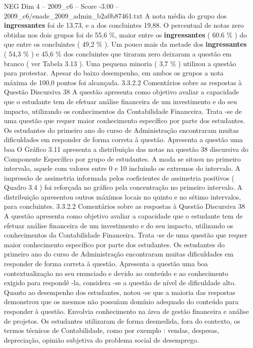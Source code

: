 \begin{textsample}{NEG Dim 4 – 2009\_c6 – Score -3.00 – 2009\_c6/enade\_2009\_admin\_b2a0b87461.txt}
A nota média do grupo dos \textbf{ingressantes} foi de 13,73, e a dos concluintes 19,88.
O percentual de notas zero obtidas nos dois grupos foi de 55,6 \%, maior entre os \textbf{ingressantes} ( 60.6 \% ) do que entre os concluintes ( 49,2 \% ).
Um pouco mais da metade dos \textbf{ingressantes} ( 54,3 \% ) e 45,6 \% dos concluintes que tiraram zero deixaram a questão em branco ( ver Tabela 3.13 ).
Uma pequena minoria ( 3,7 \% ) utilizou a questão para protestar.
Apesar do baixo desempenho, em ambos os grupos a nota máxima de 100,0 pontos foi alcançada. 3.3.2.2 Comentários sobre as respostas à Questão Discursiva 38 A questão apresenta como objetivo avaliar a capacidade que o estudante tem de efetuar análise financeira de um investimento e do seu impacto, utilizando os conhecimentos da Contabilidade Financeira.
Trata -se de uma questão que requer maior conhecimento específico por parte dos estudantes.
Os estudantes do primeiro ano do curso de Administração encontraram muitas dificuldades em responder de forma correta à questão.
Apresenta a questão uma boa O Gráfico 3.11 apresenta a distribuição das notas na questão 38 discursiva do Componente Específico por grupo de estudantes.
A moda se situou no primeiro intervalo, aquele com valores entre 0 e 10 incluindo os extremos do intervalo.
A impressão de assimetria informada pelos coeficientes de assimetria positivos ( Quadro 3.4 ) foi reforçada no gráfico pela concentração no primeiro intervalo.
A distribuição apresentou outros máximos locais no quinto e no sétimo intervalos, para concluintes. 3.3.2.2 Comentários sobre as respostas à Questão Discursiva 38 A questão apresenta como objetivo avaliar a capacidade que o estudante tem de efetuar análise financeira de um investimento e do seu impacto, utilizando os conhecimentos da Contabilidade Financeira.
Trata -se de uma questão que requer maior conhecimento específico por parte dos estudantes.
Os estudantes do primeiro ano do curso de Administração encontraram muitas dificuldades em responder de forma correta à questão.
Apresenta a questão uma boa contextualização no seu enunciado e devido ao conteúdo e ao conhecimento exigido para respondê -la, considera -se a questão de nível de dificuldade alto.
Quanto ao desempenho dos estudantes, notou -se que a maioria das respostas demonstrou que os mesmos não possuíam domínio adequado do conteúdo para responder à questão.
Envolvia conhecimento na área de gestão financeira e análise de projetos.
Os estudantes utilizaram de forma desmedida, fora do contexto, os termos técnicos de Contabilidade, como por exemplo : vendas, despesas, depreciação, opinião subjetiva do problema social de desemprego.

\end{textsample}
